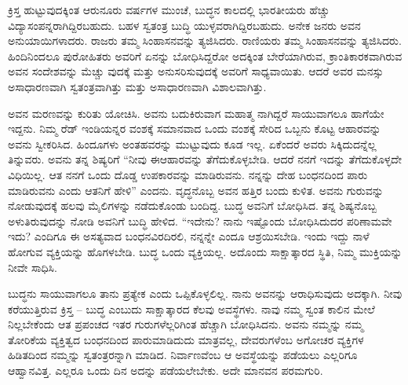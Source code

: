 ಕ್ರಿಸ್ತ ಹುಟ್ಟುವುದಕ್ಕಿಂತ ಆರುನೂರು ವರ್ಷಗಳ ಮುಂಚೆ, ಬುದ್ಧನ ಕಾಲದಲ್ಲಿ ಭಾರತೀಯರು ಹೆಚ್ಚು ವಿದ್ಯಾಸಂಪನ್ನರಾಗಿದ್ದಿರಬಹುದು. ಬಹಳ ಸ್ವತಂತ್ರ ಬುದ್ಧಿ ಯುಳ್ಳವರಾಗಿದ್ದಿರಬಹುದು. ಅನೇಕ ಜನರು ಅವನ ಅನುಯಾಯಿಗಳಾದರು. ರಾಜರು ತಮ್ಮ ಸಿಂಹಾಸನವನ್ನು ತ್ಯಜಿಸಿದರು. ರಾಣಿಯರು ತಮ್ಮ ಸಿಂಹಾಸನವನ್ನು ತ್ಯಜಿಸಿದರು. ಹಿಂದಿನಿಂದಲೂ ಪುರೋಹಿತರು ಅವರಿಗೆ ಏನನ್ನು ಬೋಧಿಸಿದ್ದರೋ ಅದಕ್ಕಿಂತ ಬೇರೆಯಾಗಿರುವ, ಕ್ರಾಂತಿಕಾರಕವಾಗಿರುವ ಅವನ ಸಂದೇಶವನ್ನು ಮೆಚ್ಚು ವುದಕ್ಕೆ ಮತ್ತು ಅನುಸರಿಸುವುದಕ್ಕೆ ಅವರಿಗೆ ಸಾಧ್ಯವಾಯಿತು. ಆದರೆ ಅವರ ಮನಸ್ಸು ಅಸಾಧಾರಣವಾಗಿ ಸ್ವತಂತ್ರವಾಗಿತ್ತು ಮತ್ತು ಅಸಾಧಾರಣವಾಗಿ ವಿಶಾಲವಾಗಿತ್ತು.

ಅವನ ಮರಣವನ್ನು ಕುರಿತು ಯೋಚಿಸಿ. ಅವನು ಬದುಕಿರುವಾಗ ಮಹಾತ್ಮ ನಾಗಿದ್ದರೆ ಸಾಯುವಾಗಲೂ ಹಾಗೆಯೇ ಇದ್ದನು. ನಿಮ್ಮ ರೆಡ್​ ಇಂಡಿಯನ್ನರ ವಂಶಕ್ಕೆ ಸಮಾನವಾದ ಒಂದು ವಂಶಕ್ಕೆ ಸೇರಿದ ಒಬ್ಬನು ಕೊಟ್ಟ ಆಹಾರವನ್ನು ಅವನು ಸ್ವೀಕರಿಸಿದ. ಹಿಂದೂಗಳು ಅಂತಹವರನ್ನು ಮುಟ್ಟುವುದು ಕೂಡ ಇಲ್ಲ. ಏಕೆಂದರೆ ಅವರು ಸಿಕ್ಕಿದುದನ್ನೆಲ್ಲ ತಿನ್ನುವರು. ಅವನು ತನ್ನ ಶಿಷ್ಯರಿಗೆ “ನೀವು ಈಆಹಾರವನ್ನು ತೆಗೆದುಕೊಳ್ಳಬೇಡಿ. ಆದರೆ ನನಗೆ ಇದನ್ನು ತೆಗೆದುಕೊಳ್ಳದೇ ವಿಧಿಯಿಲ್ಲ. ಆತ ನನಗೆ ಒಂದು ದೊಡ್ಡ ಉಪಕಾರವನ್ನು ಮಾಡಿರುವನು. ನನ್ನನ್ನು ದೇಹ ಬಂಧನದಿಂದ ಪಾರು ಮಾಡಿರುವನು ಎಂದು ಆತನಿಗೆ ಹೇಳಿ” ಎಂದನು. ವೃದ್ಧನೊಬ್ಬ ಅವನ ಹತ್ತಿರ ಬಂದು ಕುಳಿತ. ಅವನು ಗುರುವನ್ನು ನೋಡುವುದಕ್ಕೆ ಹಲವು ಮೈಲಿಗಳನ್ನು ನಡೆದುಕೊಂಡು ಬಂದಿದ್ದ. ಬುದ್ಧ ಅವನಿಗೆ ಬೋಧಿಸಿದ. ತನ್ನ ಶಿಷ್ಯನೊಬ್ಬ ಅಳುತಿರುವುದನ್ನು ನೋಡಿ ಅವನಿಗೆ ಬುದ್ಧಿ ಹೇಳಿದ. “ಇದೇನು? ನಾನು ಇಷ್ಟೊಂದು ಬೋಧಿಸಿದುದರ ಪರಿಣಾಮವೇ ಇದು? ಎಂದಿಗೂ ಈ ಅಸತ್ಯವಾದ ಬಂಧನವಿರದಿರಲಿ, ನನ್ನನ್ನೇ ಎಂದೂ ಆಶ್ರಯಿಸಬೇಡಿ. ಇಂದು ಇದ್ದು ನಾಳೆ ಹೋಗುವ ವ್ಯಕ್ತಿಯನ್ನು ಹೊಗಳಬೇಡಿ. ಬುದ್ಧ ಒಂದು ವ್ಯಕ್ತಿಯಲ್ಲ. ಅದೊಂದು ಸಾಕ್ಷಾತ್ಕಾರದ ಸ್ಥಿತಿ, ನಿಮ್ಮ ಮುಕ್ತಿಯನ್ನು ನೀವೇ ಸಾಧಿಸಿ.

ಬುದ್ಧನು ಸಾಯುವಾಗಲೂ ತಾನು ಪ್ರತ್ಯೇಕ ಎಂದು ಒಪ್ಪಿಕೊಳ್ಳಲಿಲ್ಲ. ನಾನು ಅವನನ್ನು ಆರಾಧಿಸುವುದು ಅದಕ್ಕಾಗಿ. ನೀವು ಕರೆಯುತ್ತಿರುವ ಕ್ರಿಸ್ತ – ಬುದ್ಧ ಎಂಬುದು ಸಾಕ್ಷಾತ್ಕಾರದ ಕೆಲವು ಅವಸ್ಥೆಗಳು. ನಾವು ನಮ್ಮ ಸ್ವಂತ ಕಾಲಿನ ಮೇಲೆ ನಿಲ್ಲಬೇಕೆಂದು ಆತ ಪ್ರಪಂಚದ ಇತರ ಗುರುಗಳೆಲ್ಲರಿಗಿಂತ ಹೆಚ್ಚಾಗಿ ಬೋಧಿಸಿದನು. ಅವನು ನಮ್ಮನ್ನು ನಮ್ಮ ತೋರಿಕೆಯ ವ್ಯಕ್ತಿತ್ವದ ಬಂಧನದಿಂದ ಪಾರುಮಾಡಿದುದು ಮಾತ್ರವಲ್ಲ, ದೇವರುಗಳೆಂಬ ಅಗೋಚರ ವ್ಯಕ್ತಿಗಳ ಹಿಡಿತದಿಂದ ನಮ್ಮನ್ನು ಸ್ವತಂತ್ರರನ್ನಾಗಿ ಮಾಡಿದ. ನಿರ್ವಾಣವೆಂಬ ಆ ಅವಸ್ಥೆಯನ್ನು ಪಡೆಯಲು ಎಲ್ಲರಿಗೂ ಆಹ್ವಾನವಿತ್ತ. ಎಲ್ಲರೂ ಒಂದು ದಿನ ಅದನ್ನು ಪಡೆಯಲೇಬೇಕು. ಅದೇ ಮಾನವನ ಪರಮಗುರಿ.

